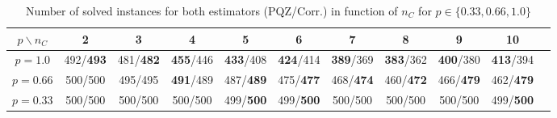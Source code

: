 \begin{table}[H]
\centering
\footnotesize
\renewcommand{\arraystretch}{1.5}
\begin{tabular}{|c|c|c|c|c|c|c|c|c|c|c|}
\hline
$p \backslash n_C$ & 2 & 3 & 4 & 5 & 6 & 7 & 8 & 9 & 10 \\
\hline
$p=1.0$ & 492/\textbf{493} & 481/\textbf{482} & \textbf{455}/446 & \textbf{433}/408 & \textbf{424}/414 & \textbf{389}/369 & \textbf{383}/362 & \textbf{400}/380 & \textbf{413}/394 \\
\hline
$p=0.66$ & 500/500 & 495/495 & \textbf{491}/489 & 487/\textbf{489} & 475/\textbf{477} & 468/\textbf{474} & 460/\textbf{472} & 466/\textbf{479} & 462/\textbf{479} \\
\hline
$p=0.33$ & 500/500 & 500/500 & 500/500 & 499/\textbf{500} & 499/\textbf{500} & 500/500 & 500/500 & 500/500 & 499/\textbf{500} \\
\hline
\end{tabular}
\caption{Number of solved instances for both estimators (PQZ/Corr.) in function of $n_C$ for $p \in \lbrace 0.33, 0.66, 1.0 \rbrace$}
    \label{nbSolvednC}
    \normalsize
\end{table}